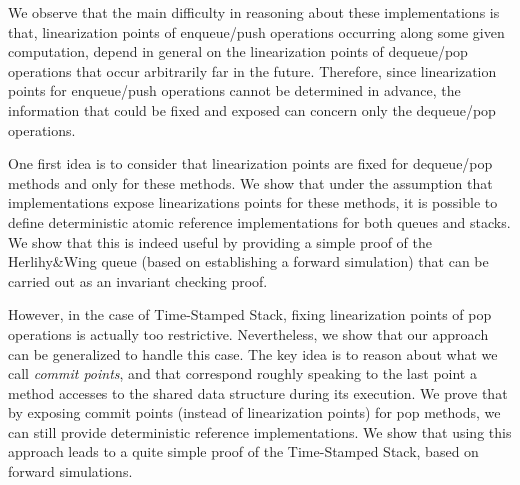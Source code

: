 We observe that the main difficulty in reasoning about these implementations is that, linearization points of enqueue/push operations occurring along some given computation, depend in general on the linearization points of dequeue/pop operations that occur arbitrarily far in the future. Therefore, since linearization points for enqueue/push operations cannot be determined in advance, the information that could be fixed and exposed can concern only the dequeue/pop operations. 

One first idea is to consider that linearization points are fixed for dequeue/pop methods and only for these methods. We show that under the assumption that implementations expose linearizations points for these methods, it is possible to define deterministic atomic reference implementations for both queues and stacks. We show that this is indeed useful by providing a simple proof of the Herlihy\&Wing queue (based on establishing a forward simulation) that can be carried out as an invariant checking proof.

However, in the case of Time-Stamped Stack, fixing linearization points of pop operations is actually too restrictive. Nevertheless, we show that our approach can be generalized to handle this case. The key idea is to reason about what we call {\em commit points}, and  that correspond roughly speaking to the last point a method accesses to the shared data structure during its execution. We prove that by exposing commit points (instead of linearization points) for pop methods, we can still provide deterministic reference implementations. We show that using this approach leads to a quite simple proof of the Time-Stamped Stack, based on forward simulations.


